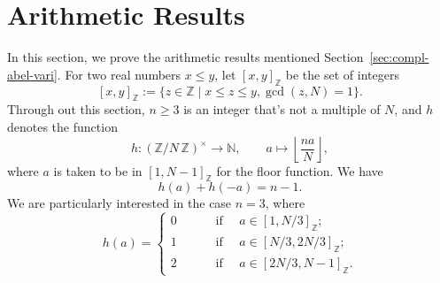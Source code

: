 \documentclass{amsart}[11pt]
\theoremstyle{definition}
\numberwithin{equation}{section}
\theoremstyle{notitle}
\begin{document}
\section{Arithmetic Results}
\label{sec:arithmetic-results}
In this section, we prove the arithmetic results mentioned
Section~\ref{sec:compl-abel-vari}.  For two real numbers $x\leq y$,
let $[x, y]_{\mathbb{Z}}$ be the set of integers \[ [x, y]_{\mathbb{Z}}:=\{z\in {\mathbb{Z}}\mid
x\leq z \leq y, \gcd(z,N)=1\}.\] Through out this section, $n\geq 3$
is an integer that's not a multiple of $N$, and $h$ denotes the
function
\[h: {(\mathbb{Z}/ {N}\, \mathbb{Z})^\times}\to {\mathbb{N}}, \qquad a\mapsto {\left\lfloor {\frac{na}{N}} \right\rfloor},\] where $a$
is taken to be in $[1,N-1]_{\mathbb{Z}}$ for the floor function.  We have
\begin{equation}
  \label{eq:4}
 h(a)+h(-a)= n-1.
\end{equation}
We are particularly interested in the case $n=3$, where
\[h(a)=
\begin{cases}
  0 \qquad &\text{ if } \quad a\in [1, N/3]_{\mathbb{Z}};\\
  1 \qquad &\text{ if } \quad a\in [N/3,2N/3]_{\mathbb{Z}};\\
  2 \qquad &\text{ if } \quad a\in [2N/3,N-1]_{\mathbb{Z}}.
\end{cases}
\]
\end{document}

